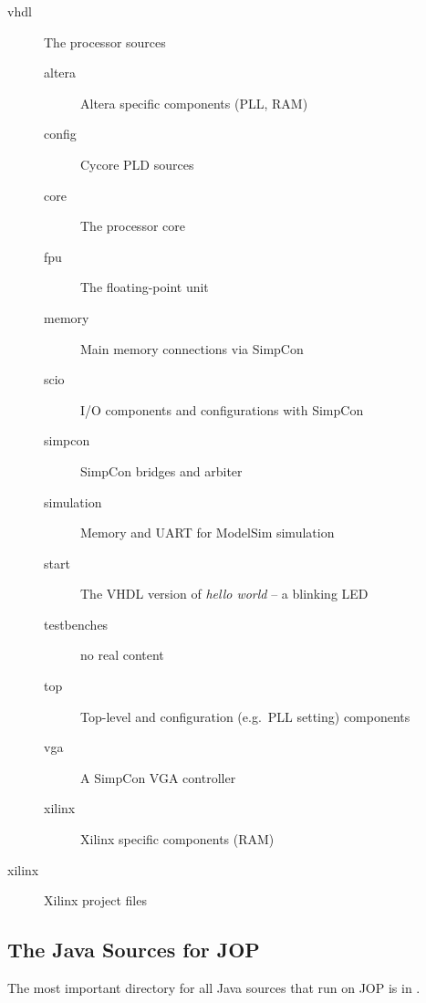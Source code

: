 \begin{description}
    \item[vhdl] The processor sources
    \begin{description}
        \item[altera] Altera specific components (PLL, RAM)
        \item[config] Cycore PLD sources
        \item[core] The processor core
        \item[fpu] The floating-point unit
        \item[memory] Main memory connections via SimpCon
        \item[scio] I/O components and configurations with
            SimpCon
        \item[simpcon] SimpCon bridges and arbiter
        \item[simulation] Memory and UART for ModelSim simulation
        \item[start] The VHDL version of \emph{hello world} -- a blinking
        LED
        \item[testbenches] no real content
        \item[top] Top-level and configuration (e.g.\ PLL setting) components
        \item[vga] A SimpCon VGA controller
        \item[xilinx] Xilinx specific components (RAM)
    \end{description}
    \item[xilinx] Xilinx project files
\end{description}

\subsection{The Java Sources for JOP}

The most important directory for all Java sources that run on JOP is
in .

